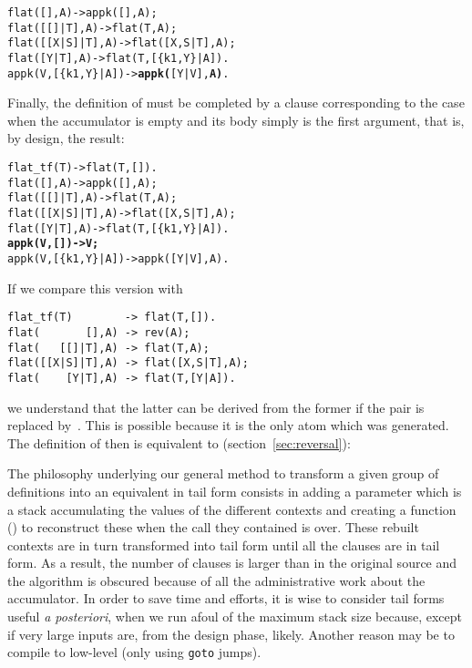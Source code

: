 \begin{enumerate}
\begin{alltt}
flat(       [],A)  -> appk([],A);
flat(   [[]|T],A)  -> flat(T,A);
flat([[X|S]|T],A)  -> flat([X,S|T],A);
flat(    [Y|T],A)  -> flat(T,[\{k1,Y\}|A]).
appk(V,[\{k1,Y\}|A]) -> \textbf{appk(}[Y|V],\textbf{A)}.
\end{alltt}
Finally, the definition of  must be completed by a
clause corresponding to the case when the accumulator is empty and its
body simply is the first argument, that is, by design, the result:
\begin{alltt}
flat\_tf(T)         -> flat(T,[]).
flat(       [],A)  -> appk([],A);
flat(   [[]|T],A)  -> flat(T,A);
flat([[X|S]|T],A)  -> flat([X,S|T],A);
flat(    [Y|T],A)  -> flat(T,[\{k1,Y\}|A]).
\textbf{appk(V,        []) -> V;}
appk(V,[\{k1,Y\}|A]) -> appk([Y|V],A).
\end{alltt}
If we compare this version with
\begin{verbatim}
flat_tf(T)        -> flat(T,[]).
flat(       [],A) -> rev(A);
flat(   [[]|T],A) -> flat(T,A);
flat([[X|S]|T],A) -> flat([X,S|T],A);
flat(    [Y|T],A) -> flat(T,[Y|A]).
\end{verbatim}
we understand that the latter can be derived from the former if the
pair  is replaced by~. This is possible
because it is the only atom which was generated. The definition of
 then is equivalent to 
(section~\vref{sec:reversal}):

\end{enumerate}
The philosophy underlying our general method to transform a given
group of definitions into an equivalent in tail form consists in
adding a parameter which is a stack accumulating the values of the
different contexts and creating a function () to
reconstruct these when the call they contained is over. These rebuilt
contexts are in turn transformed into tail form until all the clauses
are in tail form. As a result, the number of clauses is larger than in
the original source and the algorithm is obscured because of all the
administrative work about the accumulator. In order to save time and
efforts, it is wise to consider tail forms useful \emph{a posteriori},
when we run afoul of the maximum stack size because, except if very
large inputs are, from the design phase, likely. Another reason may be
to compile to low\hyp{}level \Clang (only using \texttt{goto} jumps).

